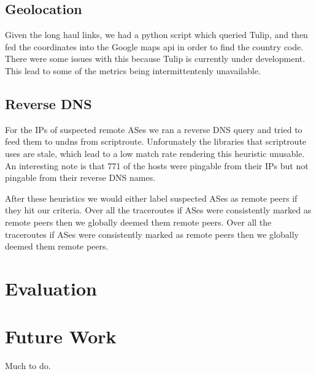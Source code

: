 \documentclass{acm_proc_article-sp}
\begin{document}
\subsection{Geolocation}
Given the long haul links, we had a python script which queried Tulip, and then fed the coordinates into the Google maps api in order to find the country code.
There were some issues with this because Tulip is currently under development. This lead to some of the metrics being intermittentenly unavailable.
\subsection{Reverse DNS}
For the IPs of suspected remote ASes we ran a reverse DNS query and tried to feed them to undns from scriptroute.
Unforunately the libraries that scriptroute uses are stale, which lead to a low match rate rendering this heuristic unusable.
An interesting note is that 771 of the hosts were pingable from their IPs but not pingable from their reverse DNS names.


After these heuristics we would either label suspected ASes as remote peers if they hit our criteria. Over all the traceroutes if ASes were consistently marked as remote peers then we globally deemed them remote peers. Over all the traceroutes if ASes were consistently marked as remote peers then we globally deemed them remote peers.


\section{Evaluation}
\label{sec:approach}

\section{Future Work}
\label{sec:future}
Much to do.



\end{document}
